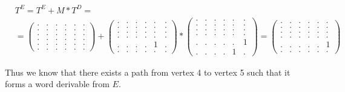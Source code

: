 {
    \renewcommand{\arraystretch}{0.7}
    \setlength\arraycolsep{2pt}
\begin{align*}
&T^E = T^E + M * T^D = \\ &=
\begin{pmatrix}
    . & . & . & . & . & . \\
    . & . & . & . & . & . \\
    . & . & . & . & . & . \\
    . & . & . & . & . & . \\ 
    . & . & . & . & . & . \\ 
    . & . & . & . & . & .
\end{pmatrix}+
\begin{pmatrix}
    . & . & . & . & . & . \\
    . & . & . & . & . & . \\
    . & . & . & . & . & . \\
    . & . & . & . & . & . \\ 
    . & . & . & . & 1 & . \\ 
    . & . & . & . & . & .
\end{pmatrix}* 
\begin{pmatrix}
    . & . & . & . & . & . \\
    . & . & . & . & . & . \\
    . & . & . & . & . & . \\
    . & . & . & . & . & . \\ 
    . & . & . & . & . & 1 \\ 
    . & . & . & . & 1 & .
\end{pmatrix}=
\begin{pmatrix}
    . & . & . & . & . & . \\
    . & . & . & . & . & . \\
    . & . & . & . & . & . \\
    . & . & . & . & . & . \\ 
    . & . & . & . & . & 1 \\ 
    . & . & . & . & . & .
\end{pmatrix}
\end{align*}
}

Thus we know that there exists a path from vertex 4 to vertex 5 such that it forms a word derivable from $E$.

